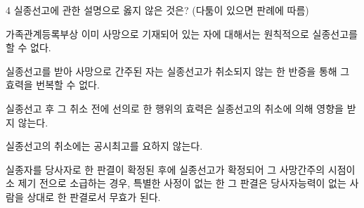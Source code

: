 \begin{question}{4}
실종선고에 관한 설명으로 옳지 않은 것은? (다툼이 있으면 판례에 따름)
\begin{choices}
  \item 가족관계등록부상 이미 사망으로 기재되어 있는 자에 대해서는 원칙적으로 실종선고를 할 수 없다.
  \item 실종선고를 받아 사망으로 간주된 자는 실종선고가 취소되지 않는 한 반증을 통해 그 효력을 번복할 수 없다.
  \item 실종선고 후 그 취소 전에 선의로 한 행위의 효력은 실종선고의 취소에 의해 영향을 받지 않는다.
  \item 실종선고의 취소에는 공시최고를 요하지 않는다.
  \item 실종자를 당사자로 한 판결이 확정된 후에 실종선고가 확정되어 그 사망간주의 시점이 소 제기 전으로 소급하는 경우, 특별한 사정이 없는 한 그 판결은 당사자능력이 없는 사람을 상대로 한 판결로서 무효가 된다.
\end{choices}
\end{question}
